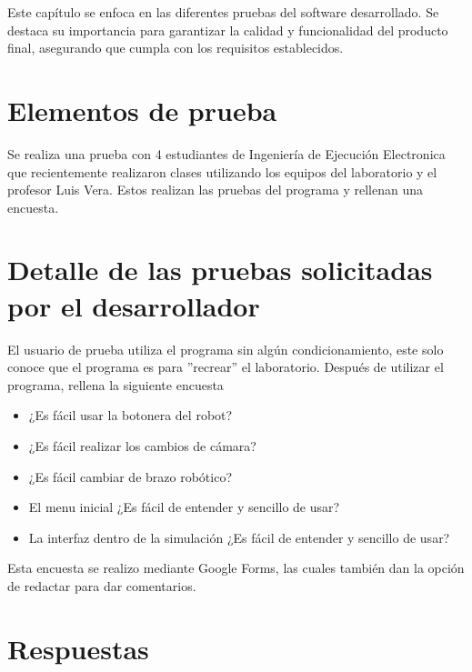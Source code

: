 Este capítulo se enfoca en las diferentes pruebas del software desarrollado. Se destaca su importancia para garantizar la calidad y funcionalidad del producto final, asegurando que cumpla con los requisitos establecidos.
\section{Elementos de prueba}
Se realiza una prueba con 4 estudiantes de Ingeniería de Ejecución Electronica que recientemente realizaron clases utilizando los equipos del laboratorio y el profesor Luis Vera.
Estos realizan las pruebas del programa y rellenan una encuesta.

\section{Detalle de las pruebas solicitadas por el desarrollador}
El usuario de prueba utiliza el programa sin algún condicionamiento, este solo conoce que el programa es para ''recrear'' el laboratorio.
Después de utilizar el programa, rellena la siguiente encuesta
\begin{itemize}
\item ¿Es fácil usar la botonera del robot?
\item ¿Es fácil realizar los cambios de cámara?
\item ¿Es fácil cambiar de brazo robótico?
\item El menu inicial ¿Es fácil de entender y sencillo de usar?
\item La interfaz dentro de la simulación ¿Es fácil de entender y sencillo de usar?
\end{itemize}

Esta encuesta se realizo mediante Google Forms, las cuales también dan la opción de redactar para dar comentarios.

\clearpage
\section{Respuestas}

